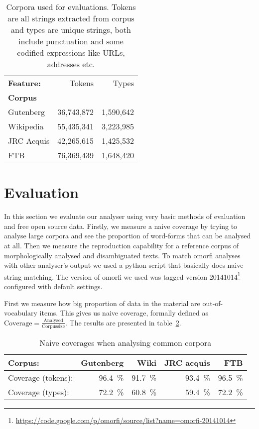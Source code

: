 \documentclass[a4paper,12pt]{article}
\begin{document}
\begin{table}
    \begin{scriptsize}
  \centering
    \begin{tabular}{|l|r|r|}
        \hline
        \bf Feature: & Tokens     & Types     \\
        \bf Corpus   &            &           \\
        \hline
        Gutenberg    & 36,743,872 & 1,590,642 \\
        Wikipedia    & 55,435,341 & 3,223,985 \\
        JRC Acquis   & 42,265,615 & 1,425,532 \\
        FTB          & 76,369,439 & 1,648,420 \\
        \hline
    \end{tabular}
  \caption{Corpora used for evaluations. Tokens are all strings extracted from
      corpus and types are unique strings, both include punctuation and some
      codified expressions like URLs, addresses etc.
  \label{table:corpora}}
  \end{scriptsize}
\end{table}

\section{Evaluation}
\label{sec:evaluation}

In this section we evaluate our analyser using very basic methods of evaluation
and free open source data. Firstly, we measure a naive coverage by trying to
analyse large corpora and see the proportion of word-forms that can be analysed
at all. Then we measure the reproduction capability for a reference corpus of
morphologically analysed and disambiguated texts. To match omorfi analyses with
other analyser's output we used a python script that basically does naive
string matching. The version of omorfi we used was tagged version
20141014\footnote{\url{https://code.google.com/p/omorfi/source/list?name=omorfi-20141014}}
configured with default settings.


First we measure how big proportion of data in the material are
out-of-vocabulary items. This gives us naive coverage, formally defined as
$\mathrm{Coverage} = \frac{\mathrm{Analysed}}{\mathrm{Corpus size}}$.
The results are presented in table~\ref{table:coverage}. 

\begin{table}
    \begin{scriptsize}
    \centering
    \begin{tabular}{|l|r|r|r|r|}
        \hline
        Corpus:            & \bf Gutenberg & \bf Wiki & \bf JRC acquis & \bf FTB \\
        \hline
        Coverage (tokens): & 96.4~\%       & 91.7~\%  & 93.4~\%        & 96.5~\% \\
        Coverage (types):  & 72.2~\%       & 60.8~\%  & 59.4~\%        & 72.2~\% \\
        \hline
    \end{tabular}
    \caption{Naive coverages when analysing common corpora
    \label{table:coverage}}
  \end{scriptsize}
\end{table}
\end{document}
